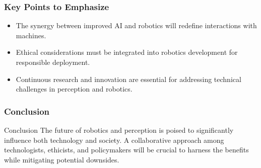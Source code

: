 \documentclass{beamer}
\begin{document}
\begin{frame}[fragile]
    \frametitle{Key Points to Emphasize}
    \begin{itemize}
        \item The synergy between improved AI and robotics will redefine interactions with machines.
        \item Ethical considerations must be integrated into robotics development for responsible deployment.
        \item Continuous research and innovation are essential for addressing technical challenges in perception and robotics.
    \end{itemize}
\end{frame}

\begin{frame}[fragile]
    \frametitle{Conclusion}
    \begin{block}{Conclusion}
        The future of robotics and perception is poised to significantly influence both technology and society. A collaborative approach among technologists, ethicists, and policymakers will be crucial to harness the benefits while mitigating potential downsides.
    \end{block}
\end{frame}
\end{document}
